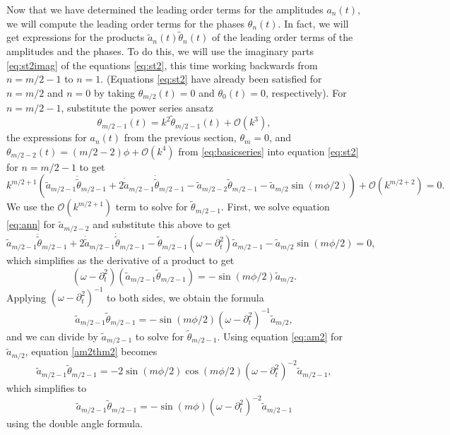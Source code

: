 \documentclass[11pt,reqno]{amsart}
\begin{document}
Now that we have determined the leading order terms for the amplitudes $a_n(t)$, we will compute the leading order terms for the phases $\theta_n(t)$. In fact, we will get expressions for the products $\tilde{a}_n(t) \tilde{\theta}_n(t)$ of the leading order terms of the amplitudes and the phases. To do this, we will use the imaginary parts \cref{eq:st2imag} of the equations \cref{eq:st2}, this time working backwards from $n = m/2-1$ to $n=1$. (Equations \cref{eq:st2} have already been satisfied for $n=m/2$ and $n=0$ by taking $\theta_{m/2}(t) = 0$ and $\theta_0(t) = 0$, respectively). For $n=m/2-1$, substitute the power series ansatz
\[
\theta_{m/2-1}(t) = k^2 \tilde{\theta}_{m/2-1}(t) + \mathcal{O}(k^{3}),
\]
the expressions for $a_n(t)$ from the previous section, $\theta_m = 0$, and
$\theta_{m/2-2}(t) = (m/2-2)\phi + \mathcal{O}(k^4)$ from \cref{eq:basicseries} into equation \cref{eq:st2} for $n=m/2-1$ to get
\[
k^{m/2+1} \left( \tilde{a}_{m/2-1} \ddot{\tilde{\theta}}_{m/2-1} + 2 \dot{\tilde{a}}_{m/2-1} \dot{\tilde{\theta}}_{m/2-1} - \tilde{a}_{m/2-2} \tilde{\theta}_{m/2-1} - \tilde{a}_{m/2} \sin(m \phi/2) \right) + \mathcal{O}(k^{m/2+2}) = 0.
\]
We use the $\mathcal{O}(k^{m/2+1})$ term to solve for $\tilde{\theta}_{m/2-1}$. First, we solve equation \cref{eq:ann} for $\tilde{a}_{m/2-2}$ and substitute this above to get
\[
\tilde{a}_{m/2-1} \ddot{\tilde{\theta}}_{m/2-1} + 2 \dot{\tilde{a}}_{m/2-1} \dot{\tilde{\theta}}_{m/2-1} - \tilde{\theta}_{m/2-1} (\omega - \partial_t^2) \tilde{a}_{m/2-1} - \tilde{a}_{m/2} \sin(m \phi/2) = 0,
\]
which simplifies as the derivative of a product to get
\[
(\omega - \partial_t^2)\left( \tilde{a}_{m/2-1} \tilde{\theta}_{m/2-1} \right) = -\sin(m \phi/2) \tilde{a}_{m/2}.
\]
Applying $(\omega - \partial_t^2)^{-1}$ to both sides, we obtain the formula
\begin{equation}\label{am2thm2}
\tilde{a}_{m/2-1} \tilde{\theta}_{m/2-1} = -\sin(m \phi/2) (\omega - \partial_t^2)^{-1} \tilde{a}_{m/2},
\end{equation}
and we can divide by $\tilde{a}_{m/2-1}$ to solve for $\tilde{\theta}_{m/2-1}$. Using equation \cref{eq:am2} for $\tilde{a}_{m/2}$, equation \cref{am2thm2} becomes
\[
\tilde{a}_{m/2-1} \tilde{\theta}_{m/2-1} = -2 \sin(m \phi/2) \cos( m\phi/2) (\omega - \partial_t^2)^{-2} \tilde{a}_{m/2-1},
\]
which simplifies to 
\begin{equation}\label{am2thm2a}
\tilde{a}_{m/2-1} \tilde{\theta}_{m/2-1} = -\sin(m \phi) (\omega - \partial_t^2)^{-2} \tilde{a}_{m/2-1}
\end{equation}
using the double angle formula.
\end{document}
